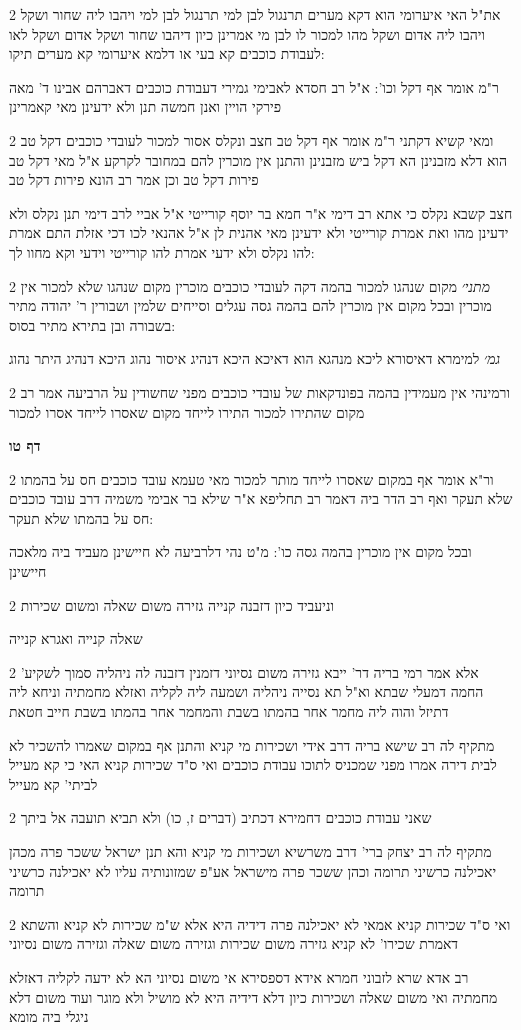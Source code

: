 \documentclass[12pt, openany]{book}
\newcommand{\sethebfont}{
\fontsize{10.5pt}{21.0pt} \selectfont
}
\newcommand{\twocol}[1]{
	{\sethebfont \begin{multicols}{2}
			#1
	\end{multicols}}	
}
\newcommand{\sectname}{}
\newcommand{\newsection}[1]{
	\addcontentsline{toc}{section}{#1}
	\renewcommand{\sectname}{#1}	
	\vspace{-\baselineskip}
	\begin{center}
		\textbf{%
\fontsize{16pt}{16pt}\selectfont
			#1}
	\end{center}
	\vspace{-\baselineskip}
	\nopagebreak
}
\begin{document}
\twocol{את"ל האי איערומי הוא דקא מערים תרנגול לבן למי תרנגול לבן למי ויהבו ליה שחור ושקל ויהבו ליה אדום ושקל מהו למכור לו לבן מי אמרינן כיון דיהבו שחור ושקל אדום ושקל לאו לעבודת כוכבים קא בעי או דלמא איערומי קא מערים תיקו:
\par ר"מ אומר אף דקל וכו': א"ל רב חסדא לאבימי גמירי דעבודת כוכבים דאברהם אבינו ד' מאה פירקי הויין ואנן חמשה תנן ולא ידעינן מאי קאמרינן}
\twocol{ומאי קשיא דקתני ר"מ אומר אף דקל טב חצב ונקלס אסור למכור לעובדי כוכבים דקל טב הוא דלא מזבנינן הא דקל ביש מזבנינן והתנן אין מוכרין להם במחובר לקרקע א"ל מאי דקל טב פירות דקל טב וכן אמר רב הונא פירות דקל טב
\par חצב קשבא נקלס כי אתא רב דימי א"ר חמא בר יוסף קורייטי א"ל אביי לרב דימי תנן נקלס ולא ידעינן מהו ואת אמרת קורייטי ולא ידעינן מאי אהנית לן א"ל אהנאי לכו דכי אזלת התם אמרת להו נקלס ולא ידעי אמרת להו קורייטי וידעי וקא מחוו לך:}
\twocol{{\large\emph{מתני׳}} מקום שנהגו למכור בהמה דקה לעובדי כוכבים מוכרין מקום שנהגו שלא למכור אין מוכרין ובכל מקום אין מוכרין להם בהמה גסה עגלים וסייחים שלמין ושבורין ר' יהודה מתיר בשבורה ובן בתירא מתיר בסוס:
\par {\large\emph{גמ׳}} למימרא דאיסורא ליכא מנהגא הוא דאיכא היכא דנהיג איסור נהוג היכא דנהיג היתר נהוג}
\twocol{ורמינהי אין מעמידין בהמה בפונדקאות של עובדי כוכבים מפני שחשודין על הרביעה אמר רב מקום שהתירו למכור התירו לייחד מקום שאסרו לייחד אסרו למכור}
\newsection{דף טו}
\twocol{ור"א אומר אף במקום שאסרו לייחד מותר למכור מאי טעמא עובד כוכבים חס על בהמתו שלא תעקר ואף רב הדר ביה דאמר רב תחליפא א"ר שילא בר אבימי משמיה דרב עובד כוכבים חס על בהמתו שלא תעקר:
\par ובכל מקום אין מוכרין בהמה גסה כו': מ"ט נהי דלרביעה לא חיישינן מעביד ביה מלאכה חיישינן}
\twocol{וניעביד כיון דזבנה קנייה גזירה משום שאלה ומשום שכירות
\par שאלה קנייה ואגרא קנייה}
\twocol{אלא אמר רמי בריה דר' ייבא גזירה משום נסיוני דזמנין דזבנה לה ניהליה סמוך לשקיע' החמה דמעלי שבתא וא"ל תא נסייה ניהליה ושמעה ליה לקליה ואזלא מחמתיה וניחא ליה דתיזל והוה ליה מחמר אחר בהמתו בשבת והמחמר אחר בהמתו בשבת חייב חטאת
\par מתקיף לה רב שישא בריה דרב אידי ושכירות מי קניא והתנן אף במקום שאמרו להשכיר לא לבית דירה אמרו מפני שמכניס לתוכו עבודת כוכבים ואי ס"ד שכירות קניא האי כי קא מעייל לביתי' קא מעייל}
\twocol{שאני עבודת כוכבים דחמירא דכתיב (דברים ז, כו) ולא תביא תועבה אל ביתך
\par מתקיף לה רב יצחק ברי' דרב משרשיא ושכירות מי קניא והא תנן ישראל ששכר פרה מכהן יאכילנה כרשיני תרומה וכהן ששכר פרה מישראל אע"פ שמזונותיה עליו לא יאכילנה כרשיני תרומה}
\twocol{ואי ס"ד שכירות קניא אמאי לא יאכילנה פרה דידיה היא אלא ש"מ שכירות לא קניא והשתא דאמרת שכירו' לא קניא גזירה משום שכירות וגזירה משום שאלה וגזירה משום נסיוני
\par רב אדא שרא לזבוני חמרא אידא דספסירא אי משום נסיוני הא לא ידעה לקליה דאזלא מחמתיה ואי משום שאלה ושכירות כיון דלא דידיה היא לא מושיל ולא מוגר ועוד משום דלא ניגלי ביה מומא}
\end{document}
